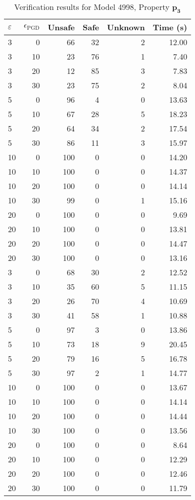 \begin{table}[htbp]
\centering
\caption{Verification results for Model 4998, Property $\mathbf{p_{3}}$}
\label{tab:model4998_r3_part6}
\begin{tabular}{lrrrrr}
\toprule
$\varepsilon$ & $\epsilon_{\scriptscriptstyle\mathrm{PGD}}$ & Unsafe & Safe & Unknown & Time (s) \\
\midrule
3 & 0 & 66 & 32 & 2 & 12.00 \\
3 & 10 & 23 & 76 & 1 & 7.40 \\
3 & 20 & 12 & 85 & 3 & 7.83 \\
3 & 30 & 23 & 75 & 2 & 8.04 \\
5 & 0 & 96 & 4 & 0 & 13.63 \\
5 & 10 & 67 & 28 & 5 & 18.23 \\
5 & 20 & 64 & 34 & 2 & 17.54 \\
5 & 30 & 86 & 11 & 3 & 15.97 \\
10 & 0 & 100 & 0 & 0 & 14.20 \\
10 & 10 & 100 & 0 & 0 & 14.37 \\
10 & 20 & 100 & 0 & 0 & 14.14 \\
10 & 30 & 99 & 0 & 1 & 15.16 \\
20 & 0 & 100 & 0 & 0 & 9.69 \\
20 & 10 & 100 & 0 & 0 & 13.81 \\
20 & 20 & 100 & 0 & 0 & 14.47 \\
20 & 30 & 100 & 0 & 0 & 13.16 \\
3 & 0 & 68 & 30 & 2 & 12.52 \\
3 & 10 & 35 & 60 & 5 & 11.15 \\
3 & 20 & 26 & 70 & 4 & 10.69 \\
3 & 30 & 41 & 58 & 1 & 10.88 \\
5 & 0 & 97 & 3 & 0 & 13.86 \\
5 & 10 & 73 & 18 & 9 & 20.45 \\
5 & 20 & 79 & 16 & 5 & 16.78 \\
5 & 30 & 97 & 2 & 1 & 14.77 \\
10 & 0 & 100 & 0 & 0 & 13.67 \\
10 & 10 & 100 & 0 & 0 & 14.14 \\
10 & 20 & 100 & 0 & 0 & 14.44 \\
10 & 30 & 100 & 0 & 0 & 13.56 \\
20 & 0 & 100 & 0 & 0 & 8.64 \\
20 & 10 & 100 & 0 & 0 & 12.29 \\
20 & 20 & 100 & 0 & 0 & 12.46 \\
20 & 30 & 100 & 0 & 0 & 11.79 \\
\bottomrule
\end{tabular}
\end{table}
